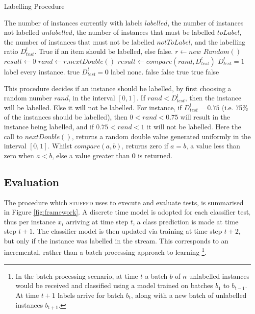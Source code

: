 \documentclass[twoside,a4paper]{refart}
\begin{document}
\begin{algorithm}[!h]
\small
\caption{Labelling Procedure}
\begin{algorithmic}[1]
\Require The number of instances currently with labels $labelled$, the number of instances not labelled $unlabelled$, the number of instances that must be labelled $toLabel$, the number of instances that must not be labelled $notToLabel$, and the labelling ratio $D_{test}^{l}$.
\Ensure True if an item should be labelled, else false.
\State $r \leftarrow new$ $Random()$
\State $result \leftarrow 0$
	\State $rand \leftarrow r.nextDouble()$
	\State $result \leftarrow compare(rand,D_{test}^{l})$
\EndWhile
{} \Comment $D_{test}^{l}=1$ label every instance.
	\State \Return true
 \Comment $D_{test}^{l}=0$ label none.
	\State \Return false
\Else
	\State \Return false
	\State \Return true
	\State \Return true
	\Else
		\State \Return false
	\EndIf
\EndIf
\EndProcedure
\end{algorithmic}
\end{algorithm}

This procedure decides if an instance should be labelled, by first choosing a random number $rand$, in the interval $[0,1]$. If $rand < D_{test}^{l}$, then the instance will be labelled. Else it will not be labelled. For instance, if $D_{test}^{l}=0.75$ (i.e. 75\% of the instances should be labelled), then $0 < rand < 0.75$ will result in the instance being labelled, and if $ 0.75 < rand < 1$ it will not be labelled. Here the call to $nextDouble()$, returns a random double value generated uniformly in the interval $[0,1]$. Whilst $compare(a,b)$, returns zero if $a = b$, a value less than zero when $a < b$, else a value greater than 0 is returned. 
\newpage
\subsection{Evaluation}
\label{sec:evaluation}
The procedure which \textsc{stuffed} uses to execute and evaluate tests, is summarised in Figure \ref{fig:framework}. A discrete time model is adopted for each classifier test, thus per instance $x_{i}$ arriving at time step $t$, a class prediction is made at time step $t+1$. The classifier model is then updated via training at time step $t+2$, but only if the instance was labelled in the stream. This corresponds to an incremental, rather than a batch processing approach to learning \footnote{In the batch processing scenario, at time $t$ a batch $b$ of $n$ unlabelled instances would be received and classified using a model trained on batches $b_{1}$ to $b_{t-1}$. At time $t+1$ labels arrive for batch $b_{t}$, along with a new batch of unlabelled instances $b_{t+1}$.}.
\end{document}
